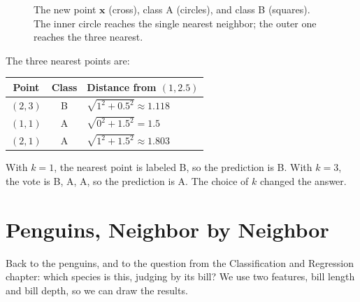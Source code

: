 \begin{figure}[H]
\centering
{}
\caption{The new point $\mathbf{x}$ (cross), class A (circles), and class B (squares). The inner circle reaches
the single nearest neighbor; the outer one reaches the three nearest.}
\label{fig:knn-worked}
\end{figure}

The three nearest points are:

\begin{center}
\begin{tabular}{c c l}
\textbf{Point} & \textbf{Class} & \textbf{Distance from $(1, 2.5)$} \\
\hline
$(2,3)$ & B & $\sqrt{1^2 + 0.5^2} \approx 1.118$ \\
$(1,1)$ & A & $\sqrt{0^2 + 1.5^2} = 1.5$ \\
$(2,1)$ & A & $\sqrt{1^2 + 1.5^2} \approx 1.803$ \\
\end{tabular}
\end{center}

With $k = 1$, the nearest point is labeled B, so the prediction is B. With $k = 3$, the vote is B, A, A, so the
prediction is A. The choice of $k$ changed the answer.

\section{Penguins, Neighbor by Neighbor}
Back to the penguins, and to the question from the Classification and Regression chapter: which species is
this, judging by its bill? We use two features, bill length and bill depth, so we can draw the results.

